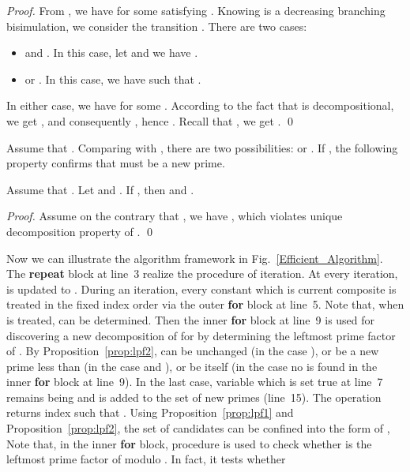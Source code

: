 \documentclass{llncs}
\begin{document}
\begin{proof}
From , we have  for some  satisfying . Knowing  is a decreasing branching bisimulation, we consider the transition . There are two cases:
\begin{itemize}
\item
 and . In this case, let  and we have .

\item
 or . In this case, we have  such that .
\end{itemize}
In either case, we have  for some . According to the fact that  is decompositional, we get , and consequently , hence . Recall that , we get . \qed
\end{proof}

Assume that  .
Comparing  with , there are two possibilities:  or . If , the following property confirms that  must be a new prime.
\begin{proposition}\label{prop:lpf2}
Assume that  .  Let  and  . If , then  and .
\end{proposition}

\begin{proof}
Assume on the contrary that , we have , which violates unique decomposition property of . \qed
\end{proof}



Now we can illustrate the algorithm framework in Fig.~\ref{Efficient_Algorithm}.  The \textbf{repeat} block at line~3 realize the procedure of iteration. At every iteration,  is updated to . During an iteration, every constant  which is current composite is treated in the fixed index order via the outer \textbf{for} block at line~5. Note that, when  is treated,  can be determined. Then the inner \textbf{for} block at line~9 is used for discovering a new decomposition of  for  by determining the leftmost prime factor  of . By Proposition~\ref{prop:lpf2},  can be unchanged (in the case ), or be a new prime less than  (in the case  and  ), or be  itself (in the case no  is found in the inner \textbf{for} block at line~9).   In the last case, variable  which is set true at line~7 remains being  and  is added to the set  of new primes (line~15).  The operation  returns index  such that .
Using Proposition~\ref{prop:lpf1} and Proposition~\ref{prop:lpf2}, the set of candidates can be confined into the form of
,
Note that, in the inner \textbf{for} block,  procedure  is used  to check whether  is the leftmost prime factor of  modulo . In fact, it tests whether
\end{document}
